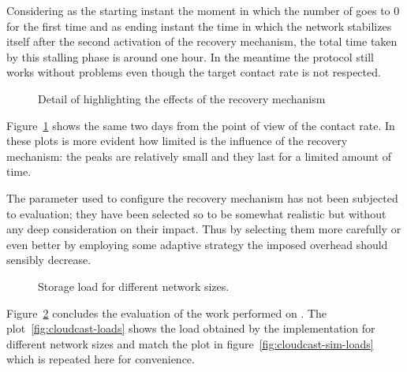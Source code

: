 Considering as the starting instant the moment in which the number of
\cloud \descriptors goes to $0$ for the first time and as ending
instant the time in which the network stabilizes itself after the
second activation of the recovery mechanism, the total time taken by
this stalling phase is around one hour. In the meantime the protocol
still works without problems even though the target \cloud contact
rate is not respected.

\begin{figure}[h!]
  \centering
  \caption{Detail of \cloud highlighting the effects of the recovery mechanism}
  \label{fig:cloudcast-dynamic-load-additions-detail}
\end{figure}

Figure~\ref{fig:cloudcast-dynamic-load-additions-detail} shows the
same two days from the point of view of the \cloud contact rate. In
these plots is more evident how limited is the influence of the
recovery mechanism: the peaks are relatively small and they last for a
limited amount of time.

The parameter used to configure the recovery mechanism has not been
subjected to evaluation; they have been selected so to be somewhat
realistic but without any deep consideration on their impact. Thus
by selecting them more carefully or even better by employing some
adaptive strategy the imposed overhead should sensibly decrease.

\begin{figure}[h!]
  \centering
  \caption{Storage \cloud load for different network sizes.}
  \label{fig:cloudcast-loads-global}
\end{figure}

Figure~\ref{fig:cloudcast-loads-global} concludes the evaluation of the
work performed on \grapes. The plot~\ref{fig:cloudcast-loads} shows the \cloud
load obtained by the implementation for different network
sizes and match the plot in figure~\ref{fig:cloudcast-sim-loads} which
is repeated here for convenience.

